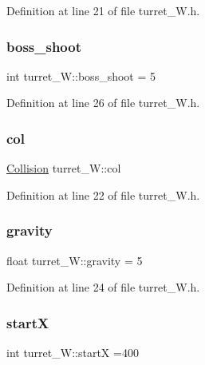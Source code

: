 Definition at line 21 of file turret\+\_\+\+W.\+h.

\hypertarget{classturret___w_a51e29c8244f2e6a2b08106acf2e55332}{}\label{classturret___w_a51e29c8244f2e6a2b08106acf2e55332} 
\subsubsection{\texorpdfstring{boss\+\_\+shoot}{boss\_shoot}}
{\footnotesize\ttfamily int turret\+\_\+\+W\+::boss\+\_\+shoot = 5}



Definition at line 26 of file turret\+\_\+\+W.\+h.

\hypertarget{classturret___w_a3d954941ca61aa3c1e43efa4314c1f29}{}\label{classturret___w_a3d954941ca61aa3c1e43efa4314c1f29} 
\subsubsection{\texorpdfstring{col}{col}}
{\footnotesize\ttfamily \hyperlink{class_collision}{Collision} turret\+\_\+\+W\+::col}



Definition at line 22 of file turret\+\_\+\+W.\+h.

\hypertarget{classturret___w_ad524e24b02c9c34ee778265f99264a1f}{}\label{classturret___w_ad524e24b02c9c34ee778265f99264a1f} 
\subsubsection{\texorpdfstring{gravity}{gravity}}
{\footnotesize\ttfamily float turret\+\_\+\+W\+::gravity = 5}



Definition at line 24 of file turret\+\_\+\+W.\+h.

\hypertarget{classturret___w_a9ae3df02b0fa517233e30ca31b8f59c6}{}\label{classturret___w_a9ae3df02b0fa517233e30ca31b8f59c6} 
\subsubsection{\texorpdfstring{startX}{startX}}
{\footnotesize\ttfamily int turret\+\_\+\+W\+::startX =400}



